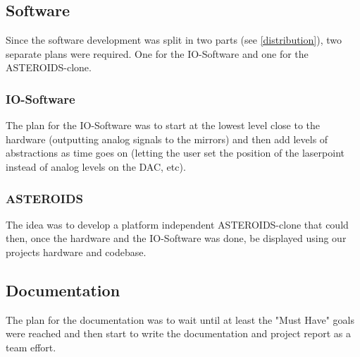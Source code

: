 \documentclass{report}
\begin{document}
\subsection{Software}
Since the software development was split in two parts (see \ref{distribution}), two separate plans were required. One for the IO-Software and one for the ASTEROIDS-clone.
\subsubsection{IO-Software}
The plan for the IO-Software was to start at the lowest level close to the hardware (outputting analog signals to the mirrors) and then add levels of abstractions as time goes on (letting the user set the position of the laserpoint instead of analog levels on the DAC, etc).
\subsubsection{ASTEROIDS}
The idea was to develop a platform independent ASTEROIDS-clone that could then, once the hardware and the IO-Software was done, be displayed using our projects hardware and codebase.
\subsection{Documentation}
The plan for the documentation was to wait until at least the "Must Have" goals were reached and then start to write the documentation and project report as a team effort.
\end{document}
